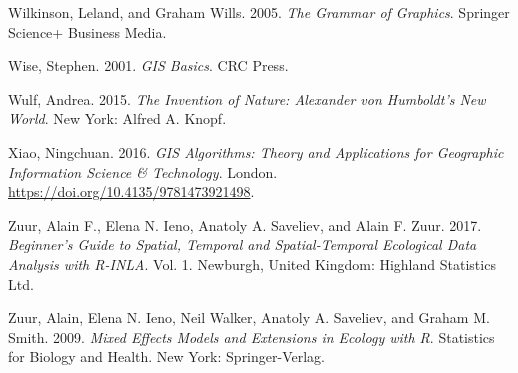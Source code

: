 \documentclass[]{krantz}
\begin{document}
\leavevmode\hypertarget{ref-wilkinson_grammar_2005}{}%
Wilkinson, Leland, and Graham Wills. 2005. \emph{The Grammar of Graphics}. Springer Science+ Business Media.

\leavevmode\hypertarget{ref-wise_gis_2001}{}%
Wise, Stephen. 2001. \emph{GIS Basics}. CRC Press.

\leavevmode\hypertarget{ref-wulf_invention_2015}{}%
Wulf, Andrea. 2015. \emph{The Invention of Nature: Alexander von Humboldt's New World}. New York: Alfred A. Knopf.

\leavevmode\hypertarget{ref-xiao_gis_2016}{}%
Xiao, Ningchuan. 2016. \emph{GIS Algorithms: Theory and Applications for Geographic Information Science \& Technology}. London. \url{https://doi.org/10.4135/9781473921498}.

\leavevmode\hypertarget{ref-zuur_beginners_2017}{}%
Zuur, Alain F., Elena N. Ieno, Anatoly A. Saveliev, and Alain F. Zuur. 2017. \emph{Beginner's Guide to Spatial, Temporal and Spatial-Temporal Ecological Data Analysis with R-INLA}. Vol. 1. Newburgh, United Kingdom: Highland Statistics Ltd.

\leavevmode\hypertarget{ref-zuur_mixed_2009}{}%
Zuur, Alain, Elena N. Ieno, Neil Walker, Anatoly A. Saveliev, and Graham M. Smith. 2009. \emph{Mixed Effects Models and Extensions in Ecology with R}. Statistics for Biology and Health. New York: Springer-Verlag.

\backmatter
\cleardoublepage
{}
\printindex
\end{document}

